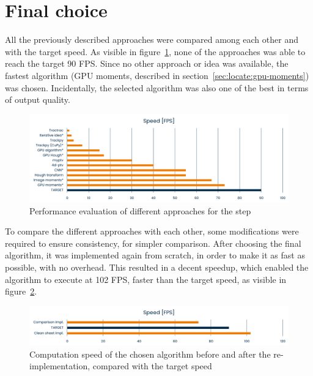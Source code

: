 \newpage
 \newpage
 \newpage
 \newpage
 \newpage
 \newpage
 \newpage
 \newpage
 \newpage
 \newpage
 \newpage
 \newpage
 \newpage
 \newpage

\section{Final choice}

All the previously described approaches were compared among each other and with the target speed.
As visible in figure~\ref{fig:locate:speed}, none of the approaches was able to reach the target 90 FPS.
Since no other approach or idea was available, the fastest algorithm (GPU moments, described in section~\ref{sec:locate:gpu-moments}) was chosen.
Incidentally, the selected algorithm was also one of the best in terms of output quality.

\begin{figure}
	\centerline{\includegraphics[width=\textwidth]{images/locate-speed-comparison.png}}
	\caption{\centering Performance evaluation of different approaches for the \locate* step}
	\label{fig:locate:speed}
\end{figure}

To compare the different approaches with each other, some modifications were required to ensure consistency, for simpler comparison.
After choosing the final algorithm, it was implemented again from scratch, in order to make it as fast as possible, with no overhead.
This resulted in a decent speedup, which enabled the algorithm to execute at 102 FPS, faster than the target speed, as visible in figure~\ref{fig:locate:speed-cleansheet}.

\begin{figure}
	\centerline{\includegraphics[width=\textwidth]{images/locate-cleansheet-speed.png}}
	\caption{\centering Computation speed of the chosen \locate* algorithm before and after the re-implementation, compared with the target speed}
	\label{fig:locate:speed-cleansheet}
\end{figure}
